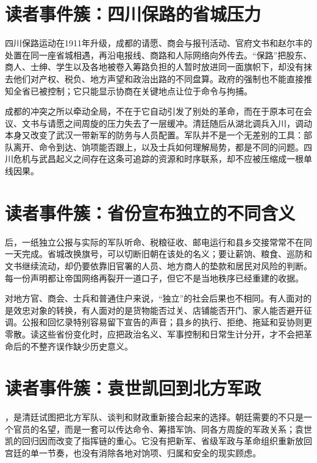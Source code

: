 \section{读者事件簇：四川保路的省城压力}

四川保路运动在1911年升级，成都的请愿、商会与报刊活动、官府文书和赵尔丰的处置在同一座省城相遇，再沿电报线、商路和人际网络向外传去。“保路”把股东、商人、士绅、学生以及各地被卷入筹路负担的人暂时放进同一面旗帜下，却没有抹去他们对产权、税负、地方声望和政治出路的不同盘算。政府的强制也不能直接推知全省已被控制；它只能显示协商在关键地点让位于命令与拘捕。

成都的冲突之所以牵动全局，不在于它自动引发了别处的革命，而在于原本可在会议、文书与请愿之间周旋的压力失去了一层缓冲。清廷随后从湖北调兵入川，调动本身又改变了武汉一带新军的防务与人员配置。军队并不是一个无差别的工具：部队离开、命令到达、饷项能否跟上，以及士兵如何理解局势，都是不同的问题。四川危机与武昌起义之间存在这条可追踪的资源和时序联系，却不应被压缩成一根单线因果。

\section{读者事件簇：省份宣布独立的不同含义}

后，一纸独立公报与实际的军队听命、税粮征收、邮电运行和县乡交接常常不在同一天完成。省城改换旗号，可以切断旧朝在该处的名义；要让薪饷、粮食、巡防和文书继续流动，却仍要依靠旧官署的人员、地方商人的垫款和居民对风险的判断。每一份声明都让帝国网络再裂开一道口子，但它不是当地秩序已经重建的收据。

对地方官、商会、士兵和普通住户来说，“独立”的社会后果也不相同。有人面对的是效忠对象的转换，有人面对的是货物能否过关、店铺能否开门、家人能否避开征调。公报和回忆录特别容易留下宣告的声音；县乡的执行、拒绝、拖延和妥协则更零散。读这些省份变化时，应把政治名义、军事控制和日常生计分开，才不会把革命后的不整齐误作缺少历史意义。

\section{读者事件簇：袁世凯回到北方军政}

，是清廷试图把北方军队、谈判和财政重新接合起来的选择。朝廷需要的不只是一个官员的名望，而是一套可以传达命令、筹措军饷、同各方周旋的军政关系；袁世凯的回归因而改变了指挥链的重心。它没有把新军、省级军政与革命组织重新放回宫廷的单一节奏，也没有消除各地对饷项、归属和安全的现实顾虑。

